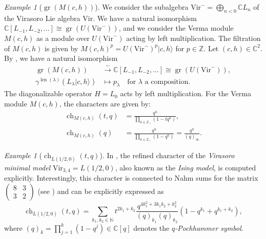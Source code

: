 \documentclass[a4paper, 12pt, reqno]{amsart}
\theoremstyle{remark}
\newtheorem{example}[theorem]{Example}
\DeclareMathOperator{\ch}{ch}
\DeclareMathOperator{\len}{len}
\DeclareMathOperator{\gr}{gr}
\newcommand{\Vir}{{\mathrm{Vir}}}
\begin{document}
\begin{example}[$\gr(M(c, h))$]
  \label{exa:2}
  We consider the subalgebra $\Vir^- = \bigoplus_{n < 0}\mathbb{C}L_n$ of the Virasoro Lie algebra $\Vir$.
  We have a natural isomorphism $\mathbb{C}[L_{-1}, L_{-2}, \dots] \cong \gr(U(\Vir^-))$, and we consider the Verma module $M(c, h)$ as a module over $U(\Vir^-)$ acting by left multiplication.
  The filtration of $M(c, h)$ is given by $M(c, h)^p = U(\Vir^-)^p|c, h\rangle$ for $p \in \mathbb{Z}$.
  Let $(c, h) \in \mathbb{C}^2$.
  By \cite[\S2]{dixmier_enveloping_1996}, we have a natural isomorphism
  \begin{align*}
    \gr(M(c, h)) &\xrightarrow{\sim} \mathbb{C}[L_{-1}, L_{-2}, \dots] \cong \gr(U(\Vir^-)), \\
    \gamma^{\len(\lambda)}(L_\lambda|c, h\rangle) & \mapsto p_\lambda \quad \text{for $\lambda$ a composition}.
  \end{align*}
  The diagonalizable operator $H = L_0$ acts by left multiplication.
  For the Verma module $M(c, h)$, the characters are given by:
  \begin{align*}
    \ch_{M(c, h)}(t, q) &= \frac{q^h}{\prod_{k \in \mathbb{Z}_+}(1 - tq^k)}, \\
    \ch_{M(c, h)}(q) &= \frac{q^h}{\prod_{k \in \mathbb{Z}_+}(1 - q^k)} = \frac{q^h}{(q)_\infty}.
  \end{align*}
\end{example}

\begin{example}[$\ch_{L(1/2, 0)}(t, q)$]
  \label{exa:3}
  In \cite{andrews_singular_2022}, the refined character of the \emph{Virasoro minimal model} $\Vir_{3, 4} = L(1/2, 0)$, also known as the \emph{Ising model}, is computed explicitly.
  Interestingly, this character is connected to Nahm sums for the matrix $\left(\begin{smallmatrix} 8 & 3 \\ 3 & 2 \end{smallmatrix}\right)$ (see \cite{Nahm2007}) and can be explicitly expressed as
  \begin{equation*}
    \ch_{L(1/2, 0)}(t, q) = \sum_{k_1, k_2 \in \mathbb{N}}t^{2k_1 + k_2}\frac{q^{4k_1^2 + 3k_1k_2 + k_2^2}}{(q)_{k_1}(q)_{k_2}}(1 - q^{k_1} + q^{k_1 + k_2}),
  \end{equation*}
  where $(q)_k = \prod_{j = 1}^k(1 - q^j) \in \mathbb{C}[q]$ denotes the \emph{$q$-Pochhammer symbol}.
\end{example}
\end{document}
